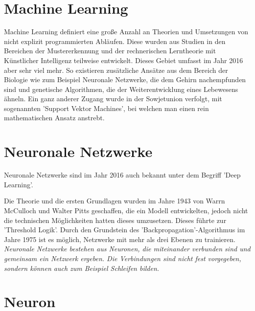 \section{Machine Learning}
\label{sec:Machine Learning}

Machine Learning definiert eine große Anzahl an Theorien und Umsetzungen von nicht explizit programmierten Abläufen. 
Diese wurden aus Studien in den Bereichen der Mustererkennung und der rechnerischen Lerntheorie mit Künstlicher Intelligenz teilweise entwickelt. 
Dieses Gebiet umfasst im Jahr 2016 aber sehr viel mehr. 
So existieren zusätzliche Ansätze aus dem Bereich der Biologie wie zum Beispiel Neuronale Netzwerke, die dem Gehirn nachempfunden sind und genetische Algorithmen, die der Weiterentwicklung eines Lebewesens ähneln. 
Ein ganz anderer Zugang wurde in der Sowjetunion verfolgt, mit sogenannten 'Support Vektor Machines', bei welchen man einen rein mathematischen Ansatz anstrebt. \cite{lampropoulos2015machine}

\section{Neuronale Netzwerke}

Neuronale Netzwerke sind im Jahr 2016 auch bekannt unter dem Begriff 'Deep Learning'. \newline

\noindent 
Die Theorie und die ersten Grundlagen wurden im Jahre 1943 von Warrn McCulloch und Walter Pitts geschaffen, die ein Modell entwickelten, jedoch nicht die technischen Möglichkeiten hatten dieses umzusetzen.
Dieses %
führte zur 'Threshold Logik'. 
Durch den Grundstein des 'Backpropagation'-Algorithmus im Jahre 1975 ist es möglich, Netzwerke mit mehr als drei Ebenen zu trainieren. \\

\noindent 
\textit{
Neuronale Netzwerke bestehen aus Neuronen, die miteinander verbunden sind und gemeinsam ein Netzwerk ergeben.%
Die Verbindungen sind nicht fest vorgegeben, sondern können auch zum Beispiel Schleifen bilden.}

\cite{AI3}

\section{Neuron}
\label{sec:Neuron}

